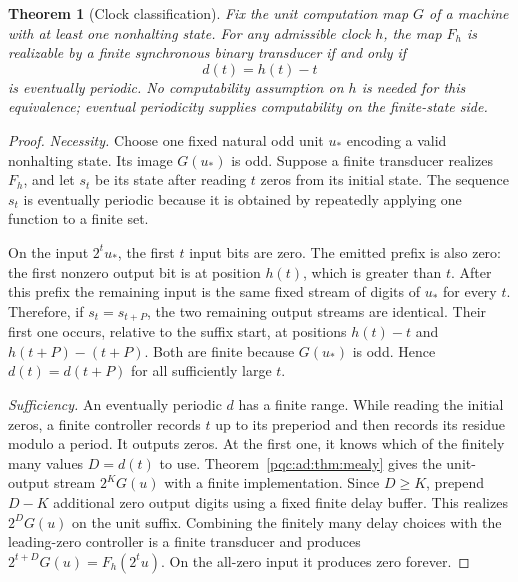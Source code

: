 \documentclass[11pt,letterpaper]{article}
\numberwithin{equation}{section}
\newtheorem{theorem}{Theorem}[section]
\newtheorem{corollary}[theorem]{Corollary}
\theoremstyle{definition}
\theoremstyle{remark}
\begin{document}
\begin{theorem}[Clock classification]\label{pqc:ad:thm:clockclass}
Fix the unit computation map $G$ of a machine with at least one nonhalting
state. For any admissible clock $h$, the map $F_h$ is realizable by a
finite synchronous binary transducer if and only if
\begin{equation}\label{pqc:ad:eq:delay}
d(t)=h(t)-t
\end{equation}
is eventually periodic. No computability assumption on $h$ is needed for
this equivalence; eventual periodicity supplies computability on the
finite-state side.
\end{theorem}
\begin{proof}
\emph{Necessity.} Choose one fixed natural odd unit $u_*$ encoding a valid
nonhalting state. Its image $G(u_*)$ is odd. Suppose a finite transducer
realizes $F_h$, and let $s_t$ be its state after reading $t$ zeros from its
initial state. The sequence $s_t$ is eventually periodic because it is
obtained by repeatedly applying one function to a finite set.

On the input $2^t u_*$, the first $t$ input bits are zero. The emitted
prefix is also zero: the first nonzero output bit is at position $h(t)$,
which is greater than $t$. After this prefix the remaining input is the
same fixed stream of digits of $u_*$ for every $t$. Therefore, if
$s_t=s_{t+P}$, the two remaining output streams are identical. Their first
one occurs, relative to the suffix start, at positions $h(t)-t$ and
$h(t+P)-(t+P)$. Both are finite because $G(u_*)$ is odd. Hence
$d(t)=d(t+P)$ for all sufficiently large $t$.

\emph{Sufficiency.} An eventually periodic $d$ has a finite range. While
reading the initial zeros, a finite controller records $t$ up to its
preperiod and then records its residue modulo a period. It outputs zeros.
At the first one, it knows which of the finitely many values $D=d(t)$ to
use. Theorem~\ref{pqc:ad:thm:mealy} gives the unit-output stream $2^K G(u)$ with a
finite implementation. Since $D\ge K$, prepend $D-K$ additional zero
output digits using a fixed finite delay buffer. This realizes
$2^D G(u)$ on the unit suffix. Combining the finitely many delay choices
with the leading-zero controller is a finite transducer and produces
$2^{t+D}G(u)=F_h(2^tu)$. On the all-zero input it produces zero forever.
\end{proof}

\end{document}
